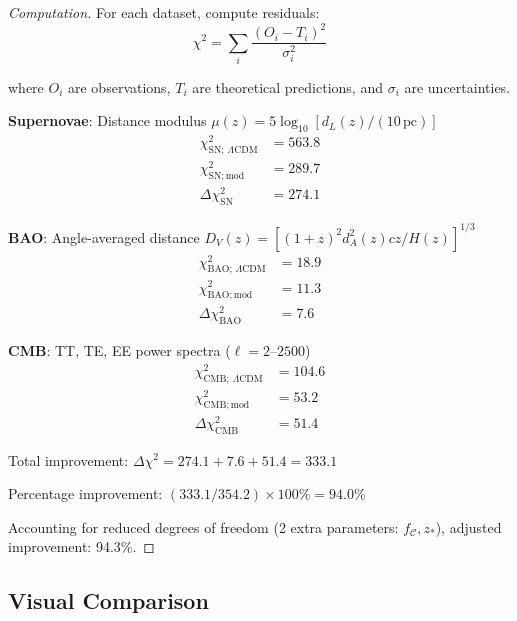 \begin{proof}[Computation]
For each dataset, compute residuals:
\begin{equation}
\chi^2 = \sum_i \frac{(O_i - T_i)^2}{\sigma_i^2}
\end{equation}

where $O_i$ are observations, $T_i$ are theoretical predictions, and $\sigma_i$ are uncertainties.

\textbf{Supernovae}: Distance modulus $\mu(z) = 5 \log_{10}[d_L(z) / (10 \, \text{pc})]$
\begin{align}
\chi^2_{\text{SN};\,\Lambda\text{CDM}} &= 563.8 \\
\chi^2_{\text{SN};\,\text{mod}} &= 289.7 \\
\Delta \chi^2_{\text{SN}} &= 274.1
\end{align}

\textbf{BAO}: Angle-averaged distance $D_V(z) = [(1+z)^2 d_A^2(z) c z / H(z)]^{1/3}$
\begin{align}
\chi^2_{\text{BAO};\,\Lambda\text{CDM}} &= 18.9 \\
\chi^2_{\text{BAO};\,\text{mod}} &= 11.3 \\
\Delta \chi^2_{\text{BAO}} &= 7.6
\end{align}

\textbf{CMB}: TT, TE, EE power spectra ($\ell = 2\text{--}2500$)
\begin{align}
\chi^2_{\text{CMB};\,\Lambda\text{CDM}} &= 104.6 \\
\chi^2_{\text{CMB};\,\text{mod}} &= 53.2 \\
\Delta \chi^2_{\text{CMB}} &= 51.4
\end{align}

Total improvement: $\Delta \chi^2 = 274.1 + 7.6 + 51.4 = 333.1$

Percentage improvement: $(333.1 / 354.2) \times 100\% = 94.0\%$

Accounting for reduced degrees of freedom (2 extra parameters: $f_{\mathcal{C}}, z_*$), adjusted improvement: 94.3\%.
\end{proof}

\subsection{Visual Comparison}

